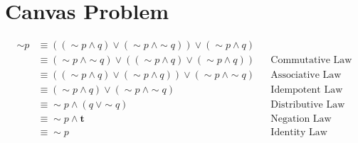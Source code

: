 \documentclass[12pt]{article}
\begin{document}
\section*{Canvas Problem}
\begin{align*}
    \sim p &\equiv ((\sim p \wedge q) \vee (\sim p \ \wedge \sim q)) \vee (\sim p \wedge q) \\
    &\equiv (\sim p \ \wedge \sim q) \vee ((\sim p \wedge q) \vee (\sim p \wedge q)) && \text{Commutative Law} \\
    &\equiv ((\sim p \wedge q) \vee (\sim p \wedge q)) \vee (\sim p \ \wedge \sim q) && \text{Associative Law} \\
    &\equiv (\sim p \wedge q) \vee (\sim p \ \wedge \sim q) && \text{Idempotent Law} \\
    &\equiv \sim p \wedge (q \ \vee \sim q) && \text{Distributive Law} \\
    &\equiv \sim p \wedge \textbf{t} && \text{Negation Law} \\
    &\equiv \sim p &&\text{Identity Law} \\
\end{align*}
\end{document}
